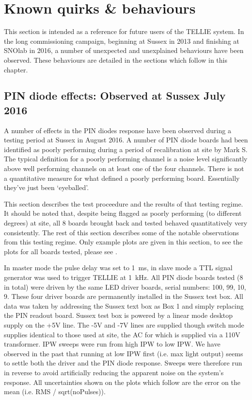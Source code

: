 \documentclass[12pt]{report}
\begin{document}
\chapter{Known quirks \& behaviours}
\label{chap:Quirks}
This section is intended as a reference for future users of the TELLIE system. In the long commissioning campaign, beginning at Sussex in 2013 and finishing at SNOlab in 2016, a number of unexpected and unexplained behaviours have been observed. These behaviours are detailed in the sections which follow in this chapter. 

\section{PIN diode effects: Observed at Sussex July 2016}
A number of effects in the PIN diodes response have been observed during a testing period at Sussex in August 2016. A number of PIN diode boards had been identified as poorly performing during a period of recalibration at site by Mark S. The typical definition for a poorly performing channel is a noise level significantly above well performing channels on at least one of the four channels. There is not a quantitative measure for what defined a poorly performing board. Essentially they've just been `eyeballed'.

This section describes the test proceedure and the results of that testing regime. It should be noted that, despite being flagged as poorly performing (to different degrees) at site, all 8 boards brought back and tested behaved quantitatively very consistently. The rest of this section describes some of the notable observations from this testing regime. Only example plots are given in this section, to see the plots for all boards tested, please see \cite{telliePINeffects}. 

In master mode the pulse delay was set to 1~ms, in slave mode a TTL signal generator was used to trigger TELLIE at 1~kHz. All PIN diode boards tested (8 in total) were driven by the same LED driver boards, serial numbers: 100, 99, 10, 9. These four driver boards are permanently installed in the Sussex test box. All data was taken by addressing the Sussex text box as Box 1 and simply replacing the PIN readout board. Sussex test box is powered by a linear mode desktop supply on the +5V line. The -5V and -7V lines are supplied though switch mode supplies identical to those used at site, the AC for which is supplied via a 110V transformer. IPW sweeps were run from high IPW to low IPW. We have observed in the past that running at low IPW first (i.e. max light output) seems to settle both the driver and the PIN diode response. Sweeps were therefore run in reverse to avoid artificially reducing the apparent noise on the system’s response. All uncertainties shown on the plots which follow are the error on the mean (i.e. RMS / sqrt(noPulses)).
\end{document}
